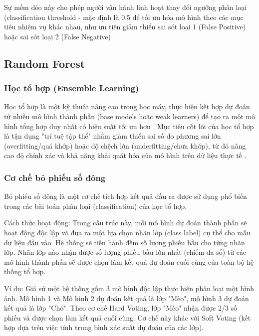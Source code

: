 Sự mềm dẻo này cho phép người vận hành linh hoạt thay đổi ngưỡng phân loại (classification threshold - mặc định là 0.5 để tối ưu hóa mô hình theo các mục tiêu nhiệm vụ khác nhau, như ưu tiên giảm thiểu sai sót loại 1 (False Positive) hoặc sai sót loại 2 (False Negative) \cite{hastie2009elements}

\subsection{Random Forest}

\subsubsection{Học tổ hợp (Ensemble Learning)}

Học tổ hợp là một kỹ thuật nâng cao trong học máy, thực hiện kết hợp dự đoán từ nhiều mô hình thành phần (base models hoặc weak learners) để tạo ra một mô hình tổng hợp duy nhất có hiệu suất tối ưu hơn \cite{hastie2009elements}. Mục tiêu cốt lõi của học tổ hợp là tận dụng "trí tuệ tập thể" nhằm giảm thiểu sai số do phương sai lớn (overfitting/quá khớp) hoặc độ chệch lớn (underfitting/chưa khớp), từ đó nâng cao độ chính xác và khả năng khái quát hóa của mô hình trên dữ liệu thực tế \cite{hastie2009elements}.

\subsubsection{Cơ chế bỏ phiếu số đông}

Bỏ phiếu số đông là một cơ chế tích hợp kết quả đầu ra được sử dụng phổ biến trong các bài toán phân loại (classification) của học tổ hợp.

Cách thức hoạt động: Trong cấu trúc này, mỗi mô hình dự đoán thành phần sẽ hoạt động độc lập và đưa ra một lựa chọn nhãn lớp (class label) cụ thể cho mẫu dữ liệu đầu vào. Hệ thống sẽ tiến hành đếm số lượng phiếu bầu cho từng nhãn lớp. Nhãn lớp nào nhận được số lượng phiếu bầu lớn nhất (chiếm đa số) từ các mô hình thành phần sẽ được chọn làm kết quả dự đoán cuối cùng của toàn bộ hệ thống tổ hợp.

Ví dụ: Giả sử một hệ thống gồm 3 mô hình độc lập thực hiện phân loại một hình ảnh. Mô hình 1 và Mô hình 2 dự đoán kết quả là lớp "Mèo", mô hình 3 dự đoán kết quả là lớp "Chó". Theo cơ chế Hard Voting, lớp "Mèo" nhận được 2/3 số phiếu và được chọn làm kết quả cuối cùng. Cơ chế này khác với Soft Voting (kết hợp dựa trên việc tính trung bình xác suất dự đoán của các lớp).

